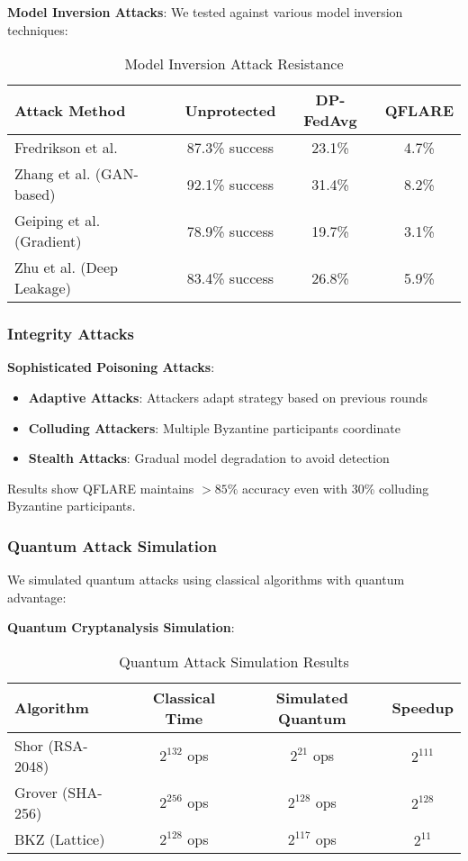 \documentclass[onecolumn,11pt]{article}
\begin{document}
\textbf{Model Inversion Attacks}:
We tested against various model inversion techniques:
\begin{table}[htbp]
\centering
\caption{Model Inversion Attack Resistance}
\begin{tabular}{|l|c|c|c|}
\hline
\textbf{Attack Method} & \textbf{Unprotected} & \textbf{DP-FedAvg} & \textbf{QFLARE} \\
\hline
Fredrikson et al. & 87.3\% success & 23.1\% & 4.7\% \\
Zhang et al. (GAN-based) & 92.1\% success & 31.4\% & 8.2\% \\
Geiping et al. (Gradient) & 78.9\% success & 19.7\% & 3.1\% \\
Zhu et al. (Deep Leakage) & 83.4\% success & 26.8\% & 5.9\% \\
\hline
\end{tabular}
\end{table}

\subsubsection{Integrity Attacks}

\textbf{Sophisticated Poisoning Attacks}:
\begin{itemize}
\item \textbf{Adaptive Attacks}: Attackers adapt strategy based on previous rounds
\item \textbf{Colluding Attackers}: Multiple Byzantine participants coordinate
\item \textbf{Stealth Attacks}: Gradual model degradation to avoid detection
\end{itemize}

Results show QFLARE maintains $>85\%$ accuracy even with 30\% colluding Byzantine participants.

\subsubsection{Quantum Attack Simulation}

We simulated quantum attacks using classical algorithms with quantum advantage:

\textbf{Quantum Cryptanalysis Simulation}:
\begin{table}[htbp]
\centering
\caption{Quantum Attack Simulation Results}
\begin{tabular}{|l|c|c|c|}
\hline
\textbf{Algorithm} & \textbf{Classical Time} & \textbf{Simulated Quantum} & \textbf{Speedup} \\
\hline
Shor (RSA-2048) & $2^{132}$ ops & $2^{21}$ ops & $2^{111}$ \\
Grover (SHA-256) & $2^{256}$ ops & $2^{128}$ ops & $2^{128}$ \\
BKZ (Lattice) & $2^{128}$ ops & $2^{117}$ ops & $2^{11}$ \\
\hline
\end{tabular}
\end{table}
\end{document}
